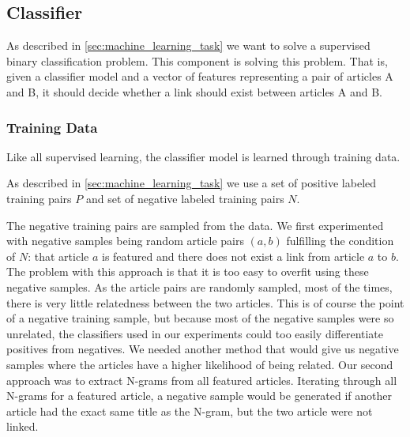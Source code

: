 \subsection{Classifier}
As described in \cref{sec:machine_learning_task} we want to solve a supervised binary classification problem. This component is solving this problem. That is, given a classifier model and a vector of features representing a pair of articles A and B, it should decide whether a link should exist between articles A and B.

\subsubsection{Training Data}
Like all supervised learning, the classifier model is learned through training data.


As described in \cref{sec:machine_learning_task} we use a set of positive labeled training pairs $P$ and set of negative labeled training pairs $N$.



The negative training pairs are sampled from the data.
We first experimented with negative samples being random article pairs $(a,b)$ fulfilling the condition of $N$: that article $a$ is featured and there does not exist a link from article $a$ to $b$. The problem with this approach is that it is too easy to overfit using these negative samples. As the article pairs are randomly sampled, most of the times, there is very little relatedness between the two articles. This is of course the point of a negative training sample, but because most of the negative samples were so unrelated, the classifiers used in our experiments could too easily differentiate positives from negatives. We needed another method that would give us negative samples where the articles have a higher likelihood of being related. Our second approach was to extract N-grams from all featured articles. Iterating through all N-grams for a featured article, a negative sample would be generated if another article had the exact same title as the N-gram, but the two article were not linked.

